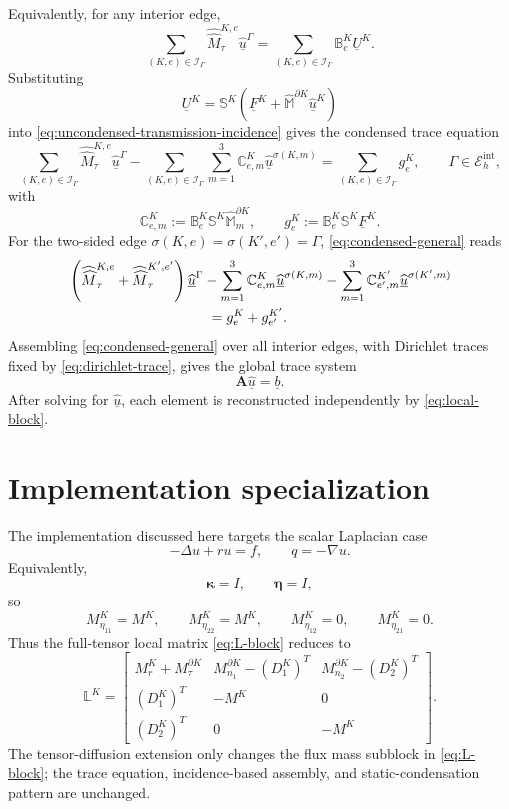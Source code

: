 \documentclass[11pt]{article}
\newcommand{\Eint}{\mathcal E_h^{\mathrm{int}}}
\newcommand{\I}{\mathcal I}
\newcommand{\uhat}{\underline{\widehat u}}
\newcommand{\UK}{\underline U^K}
\newcommand{\FK}{\underline F^K}
\newcommand{\LK}{\mathbb L^K}
\newcommand{\SK}{\mathbb S^K}
\newcommand{\B}{\mathbb B}
\newcommand{\C}{\mathbb C}
\newcommand{\Mbb}{\widehat{\mathbb M}}
\newcommand{\Mhh}{\widehat{\widehat M}}
\newcommand{\kappab}{\boldsymbol\kappa}
\newcommand{\etab}{\boldsymbol\eta}
\begin{document}
Equivalently, for any interior edge,
\begin{equation}\label{eq:uncondensed-transmission-incidence}
    \sum_{(K,e)\in\I_\Gamma}\Mhh_\tau^{K,e}\uhat^\Gamma
    =
    \sum_{(K,e)\in\I_\Gamma}\B_e^K\UK.
\end{equation}
Substituting
\[
    \UK=\SK(\FK+\Mbb^{\partial K}\uhat^K)
\]
into \eqref{eq:uncondensed-transmission-incidence} gives the condensed trace equation
\begin{equation}\label{eq:condensed-general}
    \sum_{(K,e)\in\I_\Gamma}\Mhh_\tau^{K,e}\uhat^\Gamma
    -
    \sum_{(K,e)\in\I_\Gamma}\sum_{m=1}^3
    \C_{e,m}^K\uhat^{\sigma(K,m)}
    =
    \sum_{(K,e)\in\I_\Gamma}g_e^K,
    \qquad \Gamma\in\Eint,
\end{equation}
with
\begin{equation}\label{eq:C-g}
    \C_{e,m}^K:=\B_e^K\SK\Mbb_m^{\partial K},
    \qquad
    g_e^K:=\B_e^K\SK\FK.
\end{equation}
For the two-sided edge $\sigma(K,e)=\sigma(K',e')=\Gamma$, \eqref{eq:condensed-general} reads
\begin{align}\label{eq:condensed-two-side}
    &\left(\Mhh_\tau^{K,e}+\Mhh_\tau^{K',e'}\right)\uhat^\Gamma
    -\sum_{m=1}^3\C_{e,m}^K\uhat^{\sigma(K,m)}
    -\sum_{m=1}^3\C_{e',m}^{K'}\uhat^{\sigma(K',m)} \notag\\
    &\hspace{10em}=g_e^K+g_{e'}^{K'}.
\end{align}
Assembling \eqref{eq:condensed-general} over all interior edges, with Dirichlet traces fixed by \eqref{eq:dirichlet-trace}, gives the global trace system
\begin{equation}\label{eq:global-trace}
    \mathbf A\uhat=\underline b.
\end{equation}
After solving for $\uhat$, each element is reconstructed independently by \eqref{eq:local-block}.

\section{Implementation specialization}

The implementation discussed here targets the scalar Laplacian case
\[
    -\Delta u+ru=f,
    \qquad q=-\nabla u.
\]
Equivalently,
\[
    \kappab=I,
    \qquad
    \etab=I,
\]
so
\[
    M_{\eta_{11}}^K=M^K,
    \qquad
    M_{\eta_{22}}^K=M^K,
    \qquad
    M_{\eta_{12}}^K=0,
    \qquad
    M_{\eta_{21}}^K=0.
\]
Thus the full-tensor local matrix \eqref{eq:L-block} reduces to
\begin{equation}\label{eq:L-block-scalar}
\LK=
\begin{bmatrix}
M_r^K+M_\tau^{\partial K}
& M_{n_1}^{\partial K}-(D_1^K)^T
& M_{n_2}^{\partial K}-(D_2^K)^T\\
(D_1^K)^T & -M^K & 0\\
(D_2^K)^T & 0 & -M^K
\end{bmatrix}.
\end{equation}
The tensor-diffusion extension only changes the flux mass subblock in \eqref{eq:L-block}; the trace equation, incidence-based assembly, and static-condensation pattern are unchanged.
\end{document}
